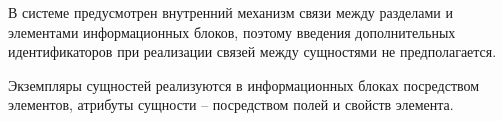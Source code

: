В системе предусмотрен внутренний механизм связи между разделами и элементами информационных блоков, поэтому введения дополнительных идентификаторов при реализации связей между сущностями не предполагается.

Экземпляры сущностей реализуются в информационных блоках посредством элементов, атрибуты сущности – посредством полей и свойств элемента. 
